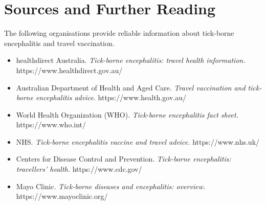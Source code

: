 \section*{Sources and Further Reading}
The following organisations provide reliable information about tick-borne encephalitis and travel vaccination.

\begin{itemize}
    \item healthdirect Australia. \textit{Tick-borne encephalitis: travel health information.} https://www.healthdirect.gov.au/
    \item Australian Department of Health and Aged Care. \textit{Travel vaccination and tick-borne encephalitis advice.} https://www.health.gov.au/
    \item World Health Organization (WHO). \textit{Tick-borne encephalitis fact sheet.} https://www.who.int/
    \item NHS. \textit{Tick-borne encephalitis vaccine and travel advice.} https://www.nhs.uk/
    \item Centers for Disease Control and Prevention. \textit{Tick-borne encephalitis: travellers' health.} https://www.cdc.gov/
    \item Mayo Clinic. \textit{Tick-borne diseases and encephalitis: overview.} https://www.mayoclinic.org/
\end{itemize}

\clearpage
